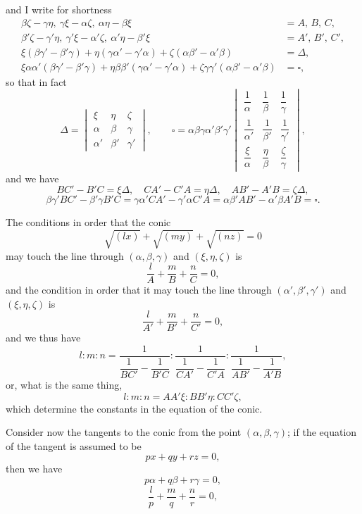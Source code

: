 \documentclass[11pt]{article}
\begin{document}
and I write for shortness
\[ \begin{aligned}
\beta\zeta-\gamma\eta,\ \gamma\xi-\alpha\zeta,\ \alpha\eta-\beta\xi &= A,\,B,\,C,\\
\beta'\zeta-\gamma'\eta,\ \gamma'\xi-\alpha'\zeta,\ \alpha'\eta-\beta'\xi &= A',\,B',\,C',\\
\xi(\beta\gamma'-\beta'\gamma)+\eta(\gamma\alpha'-\gamma'\alpha)+\zeta(\alpha\beta'-\alpha'\beta) &= \Delta,\\
\xi\alpha\alpha'(\beta\gamma'-\beta'\gamma)+\eta\beta\beta'(\gamma\alpha'-\gamma'\alpha)+\zeta\gamma\gamma'(\alpha\beta'-\alpha'\beta) &= \square,
\end{aligned} \]
so that in fact
\[ \Delta=\begin{vmatrix} \xi & \eta & \zeta \\ \alpha & \beta & \gamma \\ \alpha' & \beta' & \gamma' \end{vmatrix},\qquad
\square=\alpha\beta\gamma\alpha'\beta'\gamma'\begin{vmatrix} \dfrac{1}{\alpha} & \dfrac{1}{\beta} & \dfrac{1}{\gamma} \\[4pt] \dfrac{1}{\alpha'} & \dfrac{1}{\beta'} & \dfrac{1}{\gamma'} \\[4pt] \dfrac{\xi}{\alpha} & \dfrac{\eta}{\beta} & \dfrac{\zeta}{\gamma} \end{vmatrix}, \]
and we have
\[ BC'-B'C=\xi\Delta,\quad CA'-C'A=\eta\Delta,\quad AB'-A'B=\zeta\Delta, \]
\[ \beta\gamma'BC'-\beta'\gamma B'C=\gamma\alpha'CA'-\gamma'\alpha C'A=\alpha\beta'AB'-\alpha'\beta A'B=\square. \]

The conditions in order that the conic
\[ \sqrt{(lx)}+\sqrt{(my)}+\sqrt{(nz)}=0 \]
may touch the line through $(\alpha,\beta,\gamma)$ and $(\xi,\eta,\zeta)$ is
\[ \dfrac{l}{A}+\dfrac{m}{B}+\dfrac{n}{C}=0, \]
and the condition in order that it may touch the line through $(\alpha',\beta',\gamma')$ and $(\xi,\eta,\zeta)$ is
\[ \dfrac{l}{A'}+\dfrac{m}{B'}+\dfrac{n}{C'}=0, \]
and we thus have
\[ l:m:n = \dfrac{1}{\dfrac{1}{BC'}-\dfrac{1}{B'C}} : \dfrac{1}{\dfrac{1}{CA'}-\dfrac{1}{C'A}} : \dfrac{1}{\dfrac{1}{AB'}-\dfrac{1}{A'B}}, \]
or, what is the same thing,
\[ l:m:n = AA'\xi : BB'\eta : CC'\zeta, \]
which determine the constants in the equation of the conic.

Consider now the tangents to the conic from the point $(\alpha,\beta,\gamma)$; if the equation
of the tangent is assumed to be
\[ px+qy+rz=0, \]
then we have
\[ p\alpha+q\beta+r\gamma=0, \]
\[ \dfrac{l}{p}+\dfrac{m}{q}+\dfrac{n}{r}=0, \]
\end{document}
